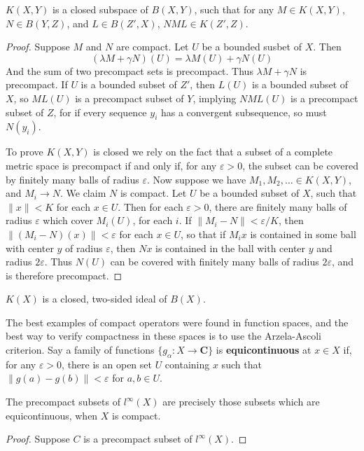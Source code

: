\begin{theorem}
    $K(X,Y)$ is a closed subspace of $B(X,Y)$, such that for any $M \in K(X,Y)$, $N \in B(Y,Z)$, and $L \in B(Z',X)$, $NML \in K(Z',Z)$.
\end{theorem}
\begin{proof}
    Suppose $M$ and $N$ are compact. Let $U$ be a bounded susbet of $X$. Then
    \[ (\lambda M + \gamma N)(U) = \lambda M(U) + \gamma N(U) \]
    And the sum of two precompact sets is precompact. Thus $\lambda M + \gamma N$ is precompact. If $U$ is a bounded subset of $Z'$, then $L(U)$ is a bounded subset of $X$, so $ML(U)$ is a precompact subset of $Y$, implying $NML(U)$ is a precompact subset of $Z$, for if every sequence $y_i$ has a convergent subsequence, so must $N(y_i)$.

    To prove $K(X,Y)$ is closed we rely on the fact that a subset of a complete metric space is precompact if and only if, for any $\varepsilon > 0$, the subset can be covered by finitely many balls of radius $\varepsilon$. Now suppose we have $M_1, M_2, \dots \in K(X,Y)$, and $M_i \to N$. We claim $N$ is compact. Let $U$ be a bounded subset of $X$, such that $\| x \| < K$ for each $x \in U$. Then for each $\varepsilon > 0$, there are finitely many balls of radius $\varepsilon$ which cover $M_i(U)$, for each $i$. If $\| M_i - N \| < \varepsilon / K$, then $\| (M_i - N)(x) \| < \varepsilon$ for each $x \in U$, so that if $M_i x$ is contained in some ball with center $y$ of radius $\varepsilon$, then $Nx$ is contained in the ball with center $y$ and radius $2 \varepsilon$. Thus $N(U)$ can be covered with finitely many balls of radius $2\varepsilon$, and is therefore precompact.
\end{proof}
\begin{corollary}
    $K(X)$ is a closed, two-sided ideal of $B(X)$.
\end{corollary}

The best examples of compact operators were found in function spaces, and the best way to verify compactness in these spaces is to use the Arzela-Ascoli criterion. Say a family of functions $\{ g_\alpha : X \to \mathbf{C} \}$ is {\bf equicontinuous} at $x \in X$ if, for any $\varepsilon > 0$, there is an open set $U$ containing $x$ such that $\| g(a) - g(b) \| < \varepsilon$ for $a,b \in U$.

\begin{theorem}
    The precompact subsets of $l^\infty(X)$ are precisely those subsets which are equicontinuous, when $X$ is compact.
\end{theorem}
\begin{proof}
    Suppose $C$ is a precompact subset of $l^\infty(X)$. 
\end{proof}

